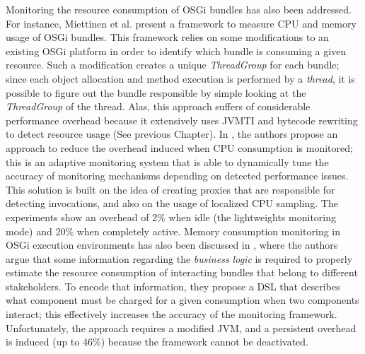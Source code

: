 Monitoring the resource consumption of OSGi bundles has also been addressed.
For instance, Miettinen et al. \cite{Miettinen2008} present a framework to measure CPU and memory usage of OSGi bundles.
This framework relies on some modifications to an existing OSGi platform in order to identify which bundle is consuming a given resource.
Such a modification creates a unique \textit{ThreadGroup} for each bundle; since each object allocation and method execution is performed by a \textit{thread}, it is possible to figure out the bundle responsible by simple looking at the \textit{ThreadGroup} of the thread.
Alas, this approach suffers of considerable performance overhead because it extensively uses JVMTI and bytecode rewriting to detect resource usage (See previous Chapter).
In \cite{Maurel:2012:AME:2304736.2304763}, the authors propose an approach to reduce the overhead induced when CPU consumption is monitored; this is an adaptive monitoring system that is able to dynamically tune the accuracy of monitoring mechanisms depending on detected performance issues.
This solution is built on the idea of creating proxies that are responsible for detecting invocations, and also on the usage of localized CPU sampling.
The experiments show an overhead of 2\% when idle (the lightweights monitoring mode) and 20\% when completely active.
Memory consumption monitoring in OSGi execution environments has also been discussed in \cite{Attouchi:2014:MMM:2602458.2602467}, where the authors argue that some information regarding the \textit{business logic} is required to properly estimate the resource consumption of interacting bundles that belong to different stakeholders. 
To encode that information, they propose a DSL that describes what component must be charged for a given consumption when two components interact; this effectively increases the accuracy of the monitoring framework.
Unfortunately, the approach requires a modified JVM, and a persistent overhead is induced (up to 46\%) because the framework cannot be deactivated.

